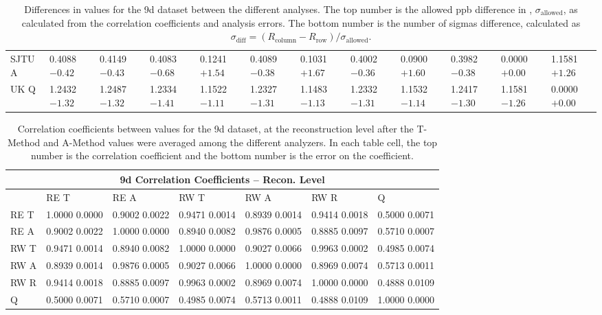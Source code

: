 \begin{landscape}
\begin{table}
\begin{tabularx}{1\linewidth}{@{\extracolsep{\fill}}lXXXXXXXXXXX}
	SJTU A & 0.4088 $-0.42$ & 0.4149 $-0.43$ & 0.4083 $-0.68$ & 0.1241 $+1.54$ & 0.4089 $-0.38$ & 0.1031 $+1.67$ & 0.4002 $-0.36$ & 0.0900 $+1.60$ & 0.3982 $-0.38$ & 0.0000 $+0.00$ & 1.1581 $+1.26$  \\
	UK Q   & 1.2432 $-1.32$ & 1.2487 $-1.32$ & 1.2334 $-1.41$ & 1.1522 $-1.11$ & 1.2327 $-1.31$ & 1.1483 $-1.13$ & 1.2332 $-1.31$ & 1.1532 $-1.14$ & 1.2417 $-1.30$ & 1.1581 $-1.26$ & 0.0000 $+0.00$  \\
  \bottomrule
\end{tabularx}
\caption[]{Differences in \R values for the 9d dataset between the different analyses. The top number is the allowed ppb difference in \R, $\sigma_{\text{allowed}}$, as calculated from the correlation coefficients and analysis errors. The bottom number is the number of sigmas difference, calculated as $\sigma_{\text{diff}} = (R_{\text{column}}-R_{\text{row}})/\sigma_{\text{allowed}}$.}
\label{tab:9d_diff}
\end{table}
\end{landscape}


\begin{table}
\setlength\tabcolsep{15pt}
\small
\centering
\renewcommand{\arraystretch}{1.4}
\begin{tabularx}{0.8\linewidth}{@{\extracolsep{\fill}}lXXXXXX}
  \toprule
  	\multicolumn{7}{c}{{\normalsize 9d Correlation Coefficients -- Recon. Level}} \\
  \midrule
  	       & RE T & RE A & RW T & RW A & RW R & \quad Q \\
  \midrule
	RE T   & 1.0000 0.0000 & 0.9002 0.0022 & 0.9471 0.0014 & 0.8939 0.0014 & 0.9414 0.0018 & 0.5000 0.0071  \\
	RE A   & 0.9002 0.0022 & 1.0000 0.0000 & 0.8940 0.0082 & 0.9876 0.0005 & 0.8885 0.0097 & 0.5710 0.0007  \\
	RW T   & 0.9471 0.0014 & 0.8940 0.0082 & 1.0000 0.0000 & 0.9027 0.0066 & 0.9963 0.0002 & 0.4985 0.0074  \\
	RW A   & 0.8939 0.0014 & 0.9876 0.0005 & 0.9027 0.0066 & 1.0000 0.0000 & 0.8969 0.0074 & 0.5713 0.0011  \\
	RW R   & 0.9414 0.0018 & 0.8885 0.0097 & 0.9963 0.0002 & 0.8969 0.0074 & 1.0000 0.0000 & 0.4888 0.0109  \\
	Q      & 0.5000 0.0071 & 0.5710 0.0007 & 0.4985 0.0074 & 0.5713 0.0011 & 0.4888 0.0109 & 1.0000 0.0000  \\
  \bottomrule
\end{tabularx}
\caption[]{Correlation coefficients between \R values for the 9d dataset, at the reconstruction level after the \RW T-Method and A-Method \R values were averaged among the different analyzers. In each table cell, the top number is the correlation coefficient and the bottom number is the error on the coefficient.}
\label{tab:Corrs_9d_recon}
\end{table}


